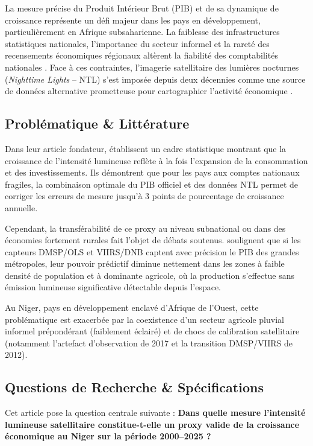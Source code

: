 La mesure précise du Produit Intérieur Brut (PIB) et de sa dynamique de croissance représente un défi majeur dans les pays en développement, particulièrement en Afrique subsaharienne. La faiblesse des infrastructures statistiques nationales, l'importance du secteur informel et la rareté des recensements économiques régionaux altèrent la fiabilité des comptabilités nationales \citep{henderson2012measuring}. Face à ces contraintes, l'imagerie satellitaire des lumières nocturnes (\textit{Nighttime Lights} -- NTL) s'est imposée depuis deux décennies comme une source de données alternative prometteuse pour cartographier l'activité économique \citep{perez2021night}.

\subsection{Problématique \& Littérature}
Dans leur article fondateur, \citet{henderson2012measuring} établissent un cadre statistique montrant que la croissance de l'intensité lumineuse reflète à la fois l'expansion de la consommation et des investissements. Ils démontrent que pour les pays aux comptes nationaux fragiles, la combinaison optimale du PIB officiel et des données NTL permet de corriger les erreurs de mesure jusqu'à 3 points de pourcentage de croissance annuelle. 

Cependant, la transférabilité de ce proxy au niveau subnational ou dans des économies fortement rurales fait l'objet de débats soutenus. \citet{perez2021night} soulignent que si les capteurs DMSP/OLS et VIIRS/DNB captent avec précision le PIB des grandes métropoles, leur pouvoir prédictif diminue nettement dans les zones à faible densité de population et à dominante agricole, où la production s'effectue sans émission lumineuse significative détectable depuis l'espace.

Au Niger, pays en développement enclavé d'Afrique de l'Ouest, cette problématique est exacerbée par la coexistence d'un secteur agricole pluvial informel prépondérant (faiblement éclairé) et de chocs de calibration satellitaire (notamment l'artefact d'observation de 2017 et la transition DMSP/VIIRS de 2012).

\subsection{Questions de Recherche \& Spécifications}

Cet article pose la question centrale suivante : \textbf{Dans quelle mesure l'intensité lumineuse satellitaire constitue-t-elle un proxy valide de la croissance économique au Niger sur la période 2000--2025 ?} 

